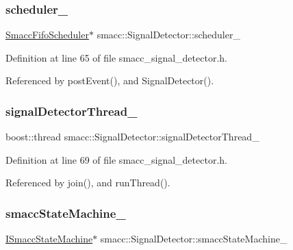 \subsubsection{\texorpdfstring{scheduler\+\_\+}{scheduler\_}}
{\footnotesize\ttfamily \hyperlink{smacc__fifo__scheduler_8h_a0063e275231c80d5f97df21d17257bf7}{Smacc\+Fifo\+Scheduler}$\ast$ smacc\+::\+Signal\+Detector\+::scheduler\+\_\+\hspace{0.3cm}{\ttfamily [private]}}



Definition at line 65 of file smacc\+\_\+signal\+\_\+detector.\+h.



Referenced by post\+Event(), and Signal\+Detector().

\mbox{\label{classsmacc_1_1SignalDetector_a4346a400cd37eafc5d1d2e63d975785e}} 
\subsubsection{\texorpdfstring{signal\+Detector\+Thread\+\_\+}{signalDetectorThread\_}}
{\footnotesize\ttfamily boost\+::thread smacc\+::\+Signal\+Detector\+::signal\+Detector\+Thread\+\_\+\hspace{0.3cm}{\ttfamily [private]}}



Definition at line 69 of file smacc\+\_\+signal\+\_\+detector.\+h.



Referenced by join(), and run\+Thread().

\mbox{\label{classsmacc_1_1SignalDetector_a46025de6ac7b5980e22144f9703236a4}} 
\subsubsection{\texorpdfstring{smacc\+State\+Machine\+\_\+}{smaccStateMachine\_}}
{\footnotesize\ttfamily \hyperlink{classsmacc_1_1ISmaccStateMachine}{I\+Smacc\+State\+Machine}$\ast$ smacc\+::\+Signal\+Detector\+::smacc\+State\+Machine\+\_\+\hspace{0.3cm}{\ttfamily [private]}}



